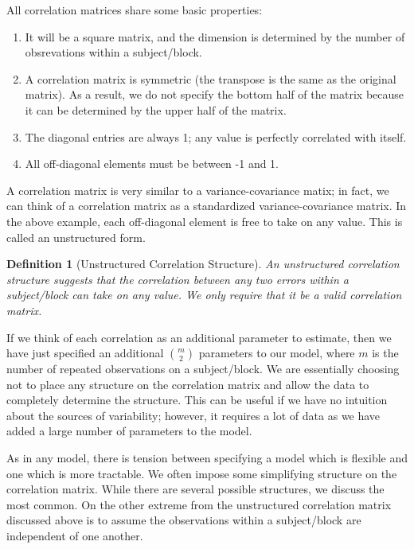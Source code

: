\documentclass[
]{book}
\providecommand{\tightlist}{%
  \setlength{\itemsep}{0pt}\setlength{\parskip}{0pt}}
\theoremstyle{plain}
\theoremstyle{mydefn}
\newtheorem{definition}{Definition}[chapter]
\theoremstyle{myexmpl}
\theoremstyle{remark}
\begin{document}
\begin{rmdkeyidea}
All correlation matrices share some basic properties:

\begin{enumerate}
\def\labelenumi{\arabic{enumi}.}
\tightlist
\item
  It will be a square matrix, and the dimension is determined by the number of obsrevations within a subject/block.
\item
  A correlation matrix is symmetric (the transpose is the same as the original matrix). As a result, we do not specify the bottom half of the matrix because it can be determined by the upper half of the matrix.
\item
  The diagonal entries are always 1; any value is perfectly correlated with itself.
\item
  All off-diagonal elements must be between -1 and 1.
\end{enumerate}
\end{rmdkeyidea}

A correlation matrix is very similar to a variance-covariance matix; in fact, we can think of a correlation matrix as a standardized variance-covariance matrix. In the above example, each off-diagonal element is free to take on any value. This is called an unstructured form.

\begin{definition}[Unstructured Correlation Structure]
An unstructured correlation structure suggests that the correlation between any two errors within a subject/block can take on any value. We only require that it be a valid correlation matrix.
\end{definition}

If we think of each correlation as an additional parameter to estimate, then we have just specified an additional \(\binom{m}{2}\) parameters to our model, where \(m\) is the number of repeated observations on a subject/block. We are essentially choosing not to place any structure on the correlation matrix and allow the data to completely determine the structure. This can be useful if we have no intuition about the sources of variability; however, it requires a lot of data as we have added a large number of parameters to the model.

As in any model, there is tension between specifying a model which is flexible and one which is more tractable. We often impose some simplifying structure on the correlation matrix. While there are several possible structures, we discuss the most common. On the other extreme from the unstructured correlation matrix discussed above is to assume the observations within a subject/block are independent of one another.
\end{document}
